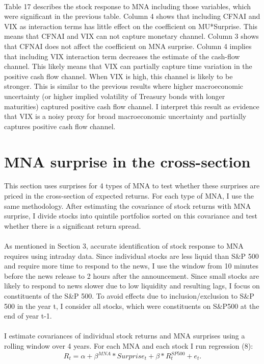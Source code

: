 \documentclass[12pt]{article}
\begin{document}
\paragraph{}
Table 17 describes the stock response to MNA including those variables, which were significant in the previous table. Column 4 shows that including CFNAI and VIX as interaction terms has little effect on the coefficient on MU*Surprise. This means that CFNAI and VIX can not capture monetary channel. Column 3 shows that CFNAI does not affect the coefficient on MNA surprise. Column 4 implies that including VIX interaction term decreases the estimate of the cash-flow channel. This likely means that VIX can partially capture time variation in the positive cash flow channel. When VIX is high, this channel is likely to be stronger. This is similar to the previous results where higher macroeconomic uncertainty (or higher implied volatility of Treasury bonds with longer maturities) captured positive cash flow channel. I interpret this result as evidence that VIX is a noisy proxy for broad macroeconomic uncertainty and partially captures positive cash flow channel.

\section{MNA surprise in the cross-section} \label{sec:Model}

This section uses surprises for 4 types of MNA to test whether these surprises are priced in the cross-section of expected returns. For each type of MNA, I use the same methodology. After estimating the covariance of stock returns with MNA surprise, I divide stocks into quintile portfolios sorted on this covariance and test whether there is a significant return spread.
\paragraph{}
As mentioned in Section 3, accurate identification of stock response to MNA requires using intraday data. Since individual stocks are less liquid than S\&P 500 and require more time to respond to the news, I use the window from 10 minutes before the news release to 2 hours after the announcement. Since small stocks are likely to respond to news slower due to low liquidity and resulting lags, I focus on constituents of the S\&P 500. To avoid effects due to inclusion/exclusion to S\&P 500 in the year t, I consider all stocks, which were constituents on S\&P500 at the end of year t-1.
\paragraph{}
I estimate covariances of individual stock returns and MNA surprises using a rolling window over 4 years. For each MNA and each stock I run regression (8):
\begin{equation}
   R_t = \alpha + \beta^{MNA} * Surprise_t + \beta*R^{SP500}_t + e_t.
\end{equation}
\end{document}
